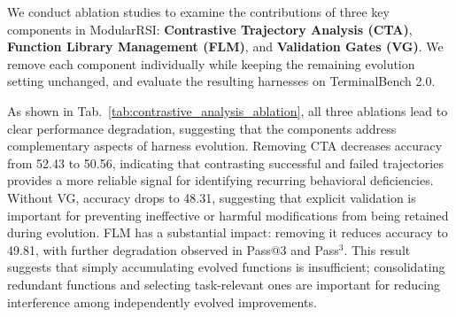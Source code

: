 \documentclass{article} %
\begin{document}
\begin{table}
\vspace{-22pt}
\centering
\small
\setlength{\tabcolsep}{4pt}

\caption{Ablation study of CTA, FLM, and VG in ModularRSI on TB 2.0.}
\label{tab:contrastive_analysis_ablation}


\vspace{-8pt}
\end{table}

We conduct ablation studies to examine the contributions of three key components in ModularRSI: \textbf{Contrastive Trajectory Analysis (CTA)}, \textbf{Function Library Management (FLM)}, and \textbf{Validation Gates (VG)}. We remove each component individually while keeping the remaining evolution setting unchanged, and evaluate the resulting harnesses on TerminalBench 2.0.

 

As shown in Tab.~\ref{tab:contrastive_analysis_ablation}, all three ablations lead to clear performance degradation, suggesting that the components address complementary aspects of harness evolution. Removing CTA decreases accuracy from 52.43 to 50.56, indicating that contrasting successful and failed trajectories provides a more reliable signal for identifying recurring behavioral deficiencies. Without VG, accuracy drops to 48.31, suggesting that explicit validation is important for preventing ineffective or harmful modifications from being retained during evolution. FLM has a substantial impact: removing it reduces accuracy to 49.81, with further degradation observed in Pass@3 and Pass$^3$. This result suggests that simply accumulating evolved functions is insufficient; consolidating redundant functions and selecting task-relevant ones are important for reducing interference among independently evolved improvements.
\end{document}
